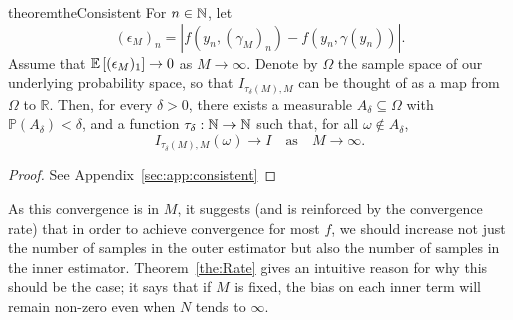 \begin{restatable}{theorem}{theConsistent} \label{the:Consistent}
	For $n \in \mathbb{N}$, let 
	\[
	(\epsilon_M)_n = \left|f(y_n, (\hat{\gamma}_M)_n) - f(y_n, \gamma(y_n))\right|.
	\]
  Assume that $\mathbb{E}\left[(\epsilon_M)_1\right] \to 0$  as $M \to \infty$. Denote by $\Omega$
  the sample space of our underlying probability space, so that $I_{\tau_\delta(M),M}$ can
  be thought of as a map from $\Omega$ to $\mathbb{R}$. Then, for every $\delta > 0$,
  there exists a measurable $A_\delta \subseteq \Omega$ with $\mathbb{P}(A_\delta) <
  \delta$, and a function $\tau_\delta : \mathbb{N} \to \mathbb{N}$ such that, for all $\omega\not\in
  A_\delta$,
	\[ 
		I_{\tau_\delta(M),M}(\omega) \to I\quad\mbox{as}\quad M \to \infty.
	\]
\end{restatable}
\begin{proof}
	See Appendix~\ref{sec:app:consistent}
\end{proof}

As this convergence is in $M$, it suggests (and is reinforced by the convergence rate) 
that in order to achieve convergence for most $f$,
we should increase not just the number of samples in the outer estimator 
but also the number of samples in the inner estimator.
Theorem~\ref{the:Rate} gives an intuitive reason for why this should be the case;
it says that if $M$ is fixed, the bias on each inner term will remain non-zero even when
$N$ tends to $\infty$.
%
%
%

